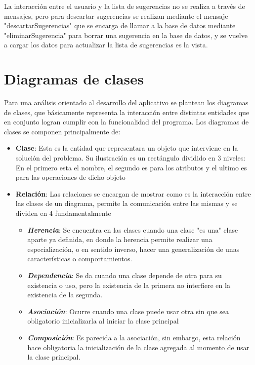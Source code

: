 La interacción entre el usuario y la lista de sugerencias no se realiza a través de mensajes, pero para descartar sugerencias se realizan mediante el mensaje "descartarSugerencias" que se encarga de llamar a la base de datos mediante "eliminarSugerencia" para borrar una sugerencia en la base de datos, y se vuelve a cargar los datos para actualizar la lista de sugerencias es la vista.

\newpage

\section{Diagramas de clases}

Para una análisis orientado al desarrollo del aplicativo se plantean los diagramas de clases, que básicamente representa la interacción entre distintas entidades que en conjunto logran cumplir con la funcionalidad del programa. Los diagramas de clases se componen principalmente de:

\begin{itemize}
	\item  \textbf{Clase}: Esta es la entidad que representara un objeto que interviene en la solución del problema. Su ilustración es un rectángulo dividido en 3 niveles: En el primero esta el nombre, el segundo es para los atributos y el ultimo es para las operaciones de dicho objeto
	\item \textbf{Relación}: Las relaciones se encargan de mostrar como es la interacción entre las clases de un diagrama, permite la comunicación entre las mismas y se dividen en 4 fundamentalmente
	\begin{itemize}
		\item \textit{\textbf{Herencia}}: Se encuentra en las clases cuando una clase "es una" clase aparte ya definida, en donde la herencia permite realizar una especialización, o en sentido inverso, hacer una generalización de unas características o comportamientos.
		\item \textit{\textbf{Dependencia}}: Se da cuando una clase depende de otra para su existencia o uso, pero la existencia de la primera no interfiere en la existencia de la segunda.
		\item \textit{\textbf{Asociación}}: Ocurre cuando una clase puede usar otra sin que sea obligatorio inicializarla al iniciar la clase principal
		\item \textit{\textbf{Composición}}: Es parecida a la asociación, sin embargo, esta relación hace obligatoria la inicialización de la clase agregada al momento de usar la clase principal.
	\end{itemize}
\end{itemize}

